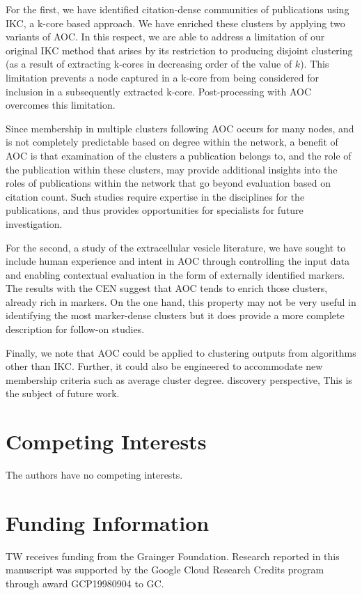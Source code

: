 \documentclass[12pt, oneside]{article}   	%
\begin{document}
For the first, we have identified citation-dense communities of publications using IKC, a k-core based approach. We have enriched these clusters by applying two variants of AOC. In this respect, we are able to address a limitation of our original IKC method that arises by its restriction to producing disjoint clustering (as a result of extracting k-cores in decreasing order of the value of $k$). This limitation prevents a node captured in a k-core from being considered for inclusion in a subsequently extracted k-core. Post-processing with AOC overcomes this limitation.

Since membership in multiple clusters following AOC occurs for many nodes, and is not completely predictable based on degree within the network, a benefit of AOC is that examination of the clusters a publication belongs to, and the role of the publication within these clusters,  may provide additional insights into the roles of publications within the network that go beyond evaluation based on citation count.
Such studies require expertise in the disciplines for the publications, and thus provides opportunities for specialists for future investigation.

For the second, a study of the extracellular vesicle literature, we have sought to include human experience and intent \citep{vonluxburg2012clustering} in AOC through controlling the input data and enabling contextual evaluation in the form of externally identified markers. The results with the CEN suggest that AOC tends to enrich those clusters, already rich in markers. On the one hand, this property may not be very useful in identifying the most marker-dense clusters but it does provide a more complete description for follow-on studies. 

Finally, we note that AOC could be applied to clustering  outputs from algorithms other than IKC. Further, it could also be engineered to accommodate new membership criteria such as average cluster degree.  discovery perspective, This is the subject of future work. 
	
\section*{Competing Interests} \vspace{3mm} The authors have no competing interests. 
	
\section*{Funding Information} TW receives funding from the Grainger Foundation. Research reported in this manuscript was supported by the Google Cloud Research Credits program through award GCP19980904 to GC.
	
\end{document}
